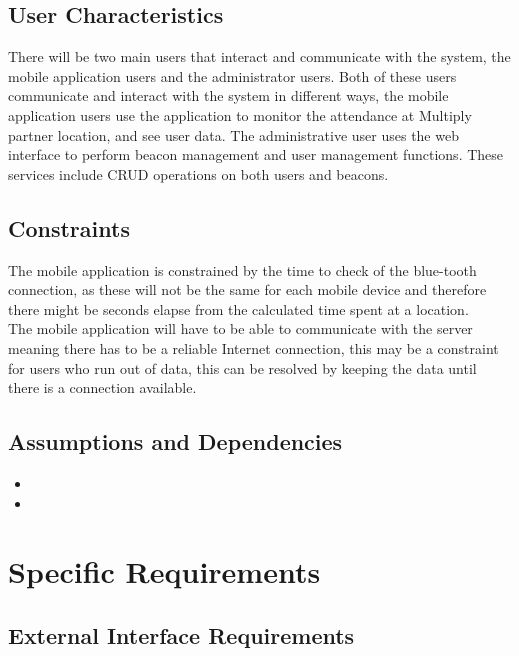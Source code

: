 \documentclass[11pt]{article}
\begin{document}
\subsection{User Characteristics}
There will be two main users that interact and communicate with the system, the mobile application users and the administrator users. Both of these users communicate and interact with the system in different ways, the mobile application users use the application to monitor the attendance at Multiply partner location, and see user data. The administrative user uses the web interface to perform beacon management and user management functions. These services include CRUD operations on both users and beacons.
   
\subsection{Constraints}
The mobile application is constrained by the time to check of the blue-tooth connection, as these will not be the same for each mobile device and therefore there might be seconds elapse from the calculated time spent at a location.\\
The mobile application will have to be able to communicate with the server meaning there has to be a reliable Internet connection, this may be a constraint for  users who run out of data, this can be resolved by keeping the data until there is a connection available.\\

\subsection{Assumptions and Dependencies}
\begin{itemize}	
	\item 
	\item 
\end{itemize}
\section{Specific Requirements}
\subsection{External Interface Requirements}
\end{document}
